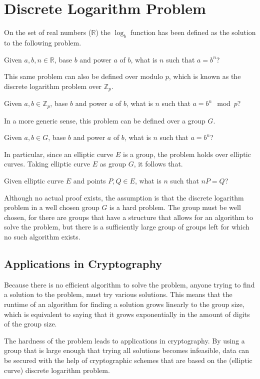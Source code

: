 \section{Discrete Logarithm Problem}
On the set of real numbers ($\mathbb{R}$) the $\log_b$ function has been defined as the solution to the following problem.
\begin{defn}
	Given $a,b,n\in\mathbb{R}$, base $b$ and power $a$ of $b$, what is $n$ such that $a=b^n$?
\end{defn}
This same problem can also be defined over modulo $p$, which is known as the discrete logarithm problem over $\mathbb{Z}_p$.
\begin{defn}
	Given $a,b\in\mathbb{Z}_p$, base $b$ and power $a$ of $b$, what is $n$ such that $a=b^n\mod{p}$?
\end{defn}
In a more generic sense, this problem can be defined over a group $G$.
\begin{defn}
	Given $a,b\in G$, base $b$ and power $a$ of $b$, what is $n$ such that $a=b^n$?
\end{defn}
In particular, since an elliptic curve $E$ is a group, the problem holds over elliptic curves. Taking elliptic curve $E$ as group $G$, it follows that.
\begin{defn}
	Given elliptic curve $E$ and points $P,Q\in E$, what is $n$ such that $nP=Q$?
\end{defn}
Although no actual proof exists, the assumption is that the discrete logarithm problem in a well chosen group $G$ is a hard problem. The group must be well chosen, for there are groups that have a structure that allows for an algorithm to solve the problem, but there is a sufficiently large group of groups left for which no such algorithm exists.

\subsection{Applications in Cryptography}
Because there is no efficient algorithm to solve the problem, anyone trying to find a solution to the problem, must try various solutions. This means that the runtime of an algorithm for finding a solution grows linearly to the group size, which is equivalent to saying that it grows exponentially in the amount of digits of the group size.

The hardness of the problem leads to applications in cryptography. By using a group that is large enough that trying all solutions becomes infeasible, data can be secured with the help of cryptographic schemes that are based on the (elliptic curve) discrete logarithm problem.

